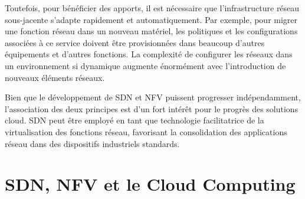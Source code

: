 Toutefois, pour bénéficier des apports, il est nécessaire que l'infrastructure réseau sous-jacente s'adapte rapidement et automatiquement. Par exemple, pour migrer une fonction réseau  dans un nouveau matériel, les politiques et les configurations associées à ce service doivent être provisionnées dans beaucoup d'autres équipements et d'autres fonctions. La complexité de configurer les réseaux dans un environnement si dynamique augmente énormément avec l'introduction de nouveaux éléments réseaux.


Bien que le développement de SDN et NFV puissent progresser indépendamment, l'association des deux principes est d'un fort intérêt pour le progrès des solutions cloud. SDN peut être employé en tant que technologie facilitatrice de la virtualisation des fonctions réseau, favorisant la consolidation des applications réseau dans des dispositifs industriels standards. 





\section{SDN, NFV et le Cloud Computing}

